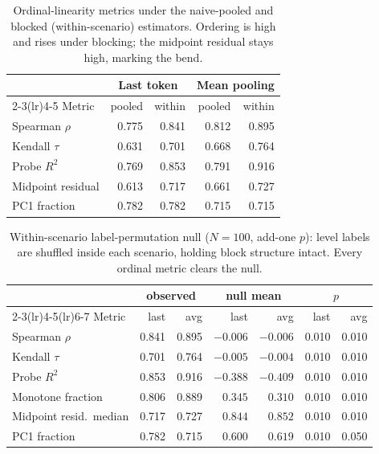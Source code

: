 \documentclass{article}
\begin{document}
\begin{table}[t]
\centering
\small
\begin{tabular}{lrrrr}
\toprule
 & \multicolumn{2}{c}{Last token} & \multicolumn{2}{c}{Mean pooling} \\
\cmidrule(lr){2-3}\cmidrule(lr){4-5}
Metric & pooled & within & pooled & within \\
\midrule
Spearman $\rho$    & 0.775 & 0.841 & 0.812 & 0.895 \\
Kendall $\tau$     & 0.631 & 0.701 & 0.668 & 0.764 \\
Probe $R^2$        & 0.769 & 0.853 & 0.791 & 0.916 \\
Midpoint residual  & 0.613 & 0.717 & 0.661 & 0.727 \\
PC1 fraction       & 0.782 & 0.782 & 0.715 & 0.715 \\
\bottomrule
\end{tabular}
\caption{Ordinal-linearity metrics under the naive-pooled and blocked
(within-scenario) estimators. Ordering is high and rises under blocking; the
midpoint residual stays high, marking the bend.}
\label{tab:lin-both}
\end{table}

\begin{table}[t]
\centering
\small
\begin{tabular}{lrrrrrr}
\toprule
 & \multicolumn{2}{c}{observed} & \multicolumn{2}{c}{null mean} & \multicolumn{2}{c}{$p$} \\
\cmidrule(lr){2-3}\cmidrule(lr){4-5}\cmidrule(lr){6-7}
Metric & last & avg & last & avg & last & avg \\
\midrule
Spearman $\rho$         & 0.841 & 0.895 & $-0.006$ & $-0.006$ & 0.010 & 0.010 \\
Kendall $\tau$          & 0.701 & 0.764 & $-0.005$ & $-0.004$ & 0.010 & 0.010 \\
Probe $R^2$             & 0.853 & 0.916 & $-0.388$ & $-0.409$ & 0.010 & 0.010 \\
Monotone fraction       & 0.806 & 0.889 & $0.345$  & $0.310$  & 0.010 & 0.010 \\
Midpoint resid.\ median & 0.717 & 0.727 & $0.844$  & $0.852$  & 0.010 & 0.010 \\
PC1 fraction            & 0.782 & 0.715 & $0.600$  & $0.619$  & 0.010 & 0.050 \\
\bottomrule
\end{tabular}
\caption{Within-scenario label-permutation null ($N=100$, add-one $p$): level
labels are shuffled inside each scenario, holding block structure intact. Every
ordinal metric clears the null.}
\label{tab:perm-both}
\end{table}
\end{document}
